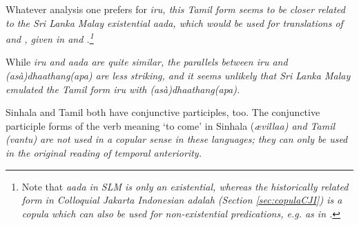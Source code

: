 \documentclass[a4paper,12pt]{article}
\begin{document}

Whatever analysis one prefers for \em iru\em, this Tamil form seems to be closer related to the Sri Lanka Malay existential \em aada\em, which would be used for translations of  and , given in  and .\footnote{Note that \em aada \em in SLM is only an existential, whereas the historically related form in Colloquial Jakarta Indonesian \em adalah \em (Section \ref{sec:copulaCJI}) is a copula which can also be used for non-existential predications, e.g. as in .}





While \em iru \em and \em aada \em are quite similar, the parallels between \em iru \em and \em (asà)dhaathang(apa) \em are less striking, and it seems unlikely that Sri Lanka Malay emulated the Tamil form \em iru \em with \em (asà)dhaa\-thang(apa).\em

Sinhala and Tamil both have conjunctive participles, too. The conjunctive participle forms of the verb meaning `to come' in Sinhala (\em \ae villaa\em) and Tamil (\em vantu\em) are not used in a copular sense in these languages; they can only be used in the original reading of temporal anteriority.


\end{document}
